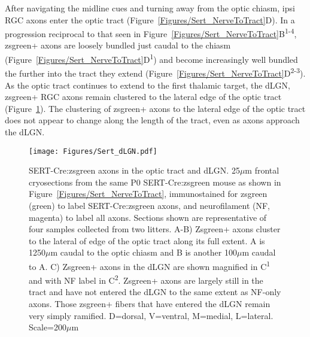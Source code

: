 After navigating the midline cues and turning away from the optic chiasm, ipsi RGC axons enter the optic tract (Figure~\ref{Figures/Sert_NerveToTract}D).
In a progression reciprocal to that seen in Figure~\ref{Figures/Sert_NerveToTract}B\textsuperscript{1-4}, zsgreen+ axons are loosely bundled just caudal to the chiasm (Figure~\ref{Figures/Sert_NerveToTract}D\textsuperscript{1}) and become increasingly well bundled the further into the tract they extend (Figure~\ref{Figures/Sert_NerveToTract}D\textsuperscript{2-3}).
As the optic tract continues to extend to the first thalamic target, the dLGN, zsgreen+ RGC axons remain clustered to the lateral edge of the optic tract (Figure~\ref{Figures/Sert_dLGN}).
The clustering of zsgreen+ axons to the lateral edge of the optic tract does not appear to change along the length of the tract, even as axons approach the dLGN.

\begin{figure}[hbtp]
	\begin{center}
		\texttt{[image: Figures/Sert\_dLGN.pdf]}
		\caption[SERT-Cre:zsgreen axons in the optic tract and dLGN.]
		{SERT-Cre:zsgreen axons in the optic tract and dLGN.
		25$\mu$m frontal cryosections from the same P0 SERT-Cre:zsgreen mouse as shown in Figure~\ref{Figures/Sert_NerveToTract}, immunostained for zsgreen (green) to label SERT-Cre:zsgreen axons, and neurofilament (NF, magenta) to label all axons.
		Sections shown are representative of four samples collected from two litters. %
		A-B) Zsgreen+ axons cluster to the lateral of edge of the optic tract along its full extent. 
		A is 1250$\mu$m caudal to the optic chiasm and B is another 100$\mu$m caudal to A.
		C) Zsgreen+ axons in the dLGN are shown magnified in C\textsuperscript{1} and with NF label in C\textsuperscript{2}.
		Zsgreen+ axons are largely still in the tract and have not entered the dLGN to the same extent as NF-only axons.
		Those zsgreen+ fibers that have entered the dLGN remain very simply ramified.
		D=dorsal, V=ventral, M=medial, L=lateral. Scale=200$\mu$m}
		\label{Figures/Sert_dLGN}
	\end{center}
\end{figure}